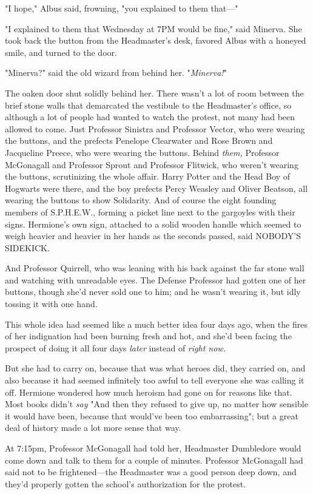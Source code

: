 "I hope," Albus said, frowning, "you explained to them that---"

"I explained to them that Wednesday at 7PM would be fine," said Minerva. She 
took back the button from the Headmaster's desk, favored Albus with a honeyed 
smile, and turned to the door.

"Minerva?" said the old wizard from behind her. "\emph{Minerva!}"

The oaken door shut solidly behind her.
\sbreak
There wasn't a lot of room between the brief stone walls that demarcated the 
vestibule to the Headmaster's office, so although a lot of people had wanted to 
watch the protest, not many had been allowed to come. Just Professor Sinistra 
and Professor Vector, who were wearing the buttons, and the prefects Penelope 
Clearwater and Rose Brown and Jacqueline Preece, who were wearing the buttons. 
Behind \emph{them,} Professor McGonagall and Professor Sprout and Professor 
Flitwick, who weren't wearing the buttons, scrutinizing the whole affair. Harry 
Potter and the Head Boy of Hogwarts were there, and the boy prefects Percy 
Weasley and Oliver Beatson, all wearing the buttons to show Solidarity. And of 
course the eight founding members of S.P.H.E.W., forming a picket line next to 
the gargoyles with their signs. Hermione's own sign, attached to a solid wooden 
handle which seemed to weigh heavier and heavier in her hands as the seconds 
passed, said NOBODY'S SIDEKICK.

And Professor Quirrell, who was leaning with his back against the far stone 
wall and watching with unreadable eyes. The Defense Professor had gotten one of 
her buttons, though she'd never sold one to him; and he wasn't wearing it, but 
idly tossing it with one hand.

This whole idea had seemed like a much better idea four days ago, when the 
fires of her indignation had been burning fresh and hot, and she'd been facing 
the prospect of doing it all four days \emph{later} instead of \emph{right now.}

But she had to carry on, because that was what heroes did, they carried on, and 
also because it had seemed infinitely too awful to tell everyone she was 
calling it off. Hermione wondered how much heroism had gone on for reasons like 
that. Most books didn't \emph{say} "And then they refused to give up, no matter 
how sensible it would have been, because that would've been too embarrassing"; 
but a great deal of history made a lot more sense that way.

At 7:15pm, Professor McGonagall had told her, Headmaster Dumbledore would come 
down and talk to them for a couple of minutes. Professor McGonagall had said 
not to be frightened---the Headmaster was a good person deep down, and they'd 
properly gotten the school's authorization for the protest.

